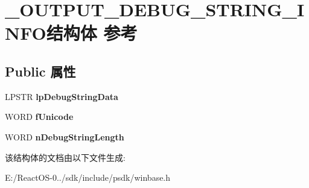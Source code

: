 \hypertarget{struct___o_u_t_p_u_t___d_e_b_u_g___s_t_r_i_n_g___i_n_f_o}{}\section{\+\_\+\+O\+U\+T\+P\+U\+T\+\_\+\+D\+E\+B\+U\+G\+\_\+\+S\+T\+R\+I\+N\+G\+\_\+\+I\+N\+F\+O结构体 参考}
\label{struct___o_u_t_p_u_t___d_e_b_u_g___s_t_r_i_n_g___i_n_f_o}
\subsection*{Public 属性}
\begin{DoxyCompactItemize}
\item 
\mbox{\label{struct___o_u_t_p_u_t___d_e_b_u_g___s_t_r_i_n_g___i_n_f_o_a7b8da4aa666cfba47382349a7ba449c5}} 
L\+P\+S\+TR {\bfseries lp\+Debug\+String\+Data}
\item 
\mbox{\label{struct___o_u_t_p_u_t___d_e_b_u_g___s_t_r_i_n_g___i_n_f_o_ac175bffe6ffe6f38cab0f9ac5bbbc3a4}} 
W\+O\+RD {\bfseries f\+Unicode}
\item 
\mbox{\label{struct___o_u_t_p_u_t___d_e_b_u_g___s_t_r_i_n_g___i_n_f_o_a9b973e603cde663ca9ca3342ba3d81da}} 
W\+O\+RD {\bfseries n\+Debug\+String\+Length}
\end{DoxyCompactItemize}


该结构体的文档由以下文件生成\+:\begin{DoxyCompactItemize}
\item 
E\+:/\+React\+O\+S-\/0../sdk/include/psdk/winbase.\+h\end{DoxyCompactItemize}
